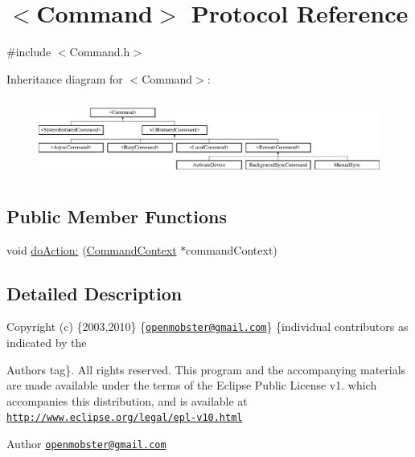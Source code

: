 \hypertarget{protocol_command-p}{
\section{$<$\-Command$>$ \-Protocol \-Reference}
\label{protocol_command-p}
}


{\ttfamily \#include $<$\-Command.\-h$>$}

\-Inheritance diagram for $<$\-Command$>$\-:\begin{figure}[H]
\begin{center}
\leavevmode
\includegraphics[height=2.604651cm]{protocol_command-p}
\end{center}
\end{figure}
\subsection*{\-Public \-Member \-Functions}
\begin{DoxyCompactItemize}
\item 
void \hyperlink{protocol_command-p_a87e057964bd959ed4c82e6021527354e}{do\-Action\-:} (\hyperlink{interface_command_context}{\-Command\-Context} $\ast$command\-Context)
\end{DoxyCompactItemize}


\subsection{\-Detailed \-Description}
\-Copyright (c) \{2003,2010\} \{\href{mailto:openmobster@gmail.com}{\tt openmobster@gmail.\-com}\} \{individual contributors as indicated by the \begin{DoxyAuthor}{\-Authors}
tag\}. \-All rights reserved. \-This program and the accompanying materials are made available under the terms of the \-Eclipse \-Public \-License v1. which accompanies this distribution, and is available at \href{http://www.eclipse.org/legal/epl-v10.html}{\tt http\-://www.\-eclipse.\-org/legal/epl-\/v10.\-html}
\end{DoxyAuthor}
\begin{DoxyAuthor}{\-Author}
\href{mailto:openmobster@gmail.com}{\tt openmobster@gmail.\-com} 
\end{DoxyAuthor}


